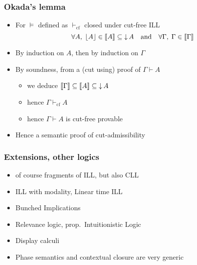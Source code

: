 \documentclass[xcolor=pdftex,graphicx=pdftex,12pt]{beamer}
\newcommand{\sem}[1]{\llbracket{#1}\rrbracket}
\newcommand{\seq}{\mathrel\vdash}
\newcommand{\pable}{\mathrel{\models}}
\begin{document}
\begin{frame}

\frametitle{Okada's lemma}

\begin{itemize}
\item For ${\pable}$ defined as ${\seq_{\textrm{cf}}}$ closed under cut-free ILL
$$\forall A,\;\ulist A\in\sem A\subseteq\dc A\quad\text{and}\quad \forall\Gamma,\;\Gamma\in\sem\Gamma$$ 
\item By induction on $A$, then by induction on $\Gamma$
\item By soundness, from a (cut using) proof of $\Gamma\seq A$
  \begin{itemize}
  \item we deduce $\sem\Gamma\subseteq\sem A\subseteq\dc A$
  \item hence $\Gamma \seq_{\textrm{cf}} A$
  \item hence $\Gamma\seq A$ is cut-free provable
  \end{itemize}
\item Hence a semantic proof of cut-admissibility
\end{itemize}

\end{frame}

\begin{frame}

\frametitle{Extensions, other logics}

\begin{itemize}
\item of course fragments of ILL, but also CLL
\item ILL with modality, Linear time ILL
\item Bunched Implications 
\item Relevance logic, prop.\ Intuitionistic Logic
\item Display calculi
\item Phase semantics and contextual closure are very generic
\end{itemize}

\end{frame}
\end{document}
